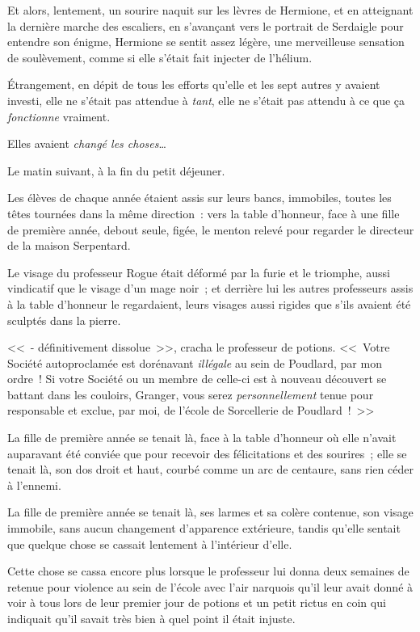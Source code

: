 Et alors, lentement, un sourire naquit sur les lèvres de Hermione, et en atteignant la dernière marche des escaliers, en s'avançant vers le portrait de Serdaigle pour entendre son énigme, Hermione se sentit assez légère, une merveilleuse sensation de soulèvement, comme si elle s'était fait injecter de l'hélium.

Étrangement, en dépit de tous les efforts qu'elle et les sept autres y avaient investi, elle ne s'était pas attendue à \emph{tant}, elle ne s'était pas attendu à ce que ça \emph{fonctionne} vraiment.

Elles avaient \emph{changé les choses}…

\later

Le matin suivant, à la fin du petit déjeuner.

Les élèves de chaque année étaient assis sur leurs bancs, immobiles, toutes les têtes tournées dans la même direction~: vers la table d'honneur, face à une fille de première année, debout seule, figée, le menton relevé pour regarder le directeur de la maison Serpentard.

Le visage du professeur Rogue était déformé par la furie et le triomphe, aussi vindicatif que le visage d'un mage noir~; et derrière lui les autres professeurs assis à la table d'honneur le regardaient, leurs visages aussi rigides que s'ils avaient été sculptés dans la pierre.

<<~- définitivement dissolue~>>, cracha le professeur de potions. <<~Votre Société autoproclamée est dorénavant \emph{illégale} au sein de Poudlard, par mon ordre~! Si votre Société ou un membre de celle-ci est à nouveau découvert se battant dans les couloirs, Granger, vous serez \emph{personnellement} tenue pour responsable et exclue, par moi, de l'école de Sorcellerie de Poudlard~!~>>

La fille de première année se tenait là, face à la table d'honneur où elle n'avait auparavant été conviée que pour recevoir des félicitations et des sourires~; elle se tenait là, son dos droit et haut, courbé comme un arc de centaure, sans rien céder à l'ennemi.

La fille de première année se tenait là, ses larmes et sa colère contenue, son visage immobile, sans aucun changement d'apparence extérieure, tandis qu'elle sentait que quelque chose se cassait lentement à l'intérieur d'elle.

Cette chose se cassa encore plus lorsque le professeur lui donna deux semaines de retenue pour violence au sein de l'école avec l'air narquois qu'il leur avait donné à voir à tous lors de leur premier jour de potions et un petit rictus en coin qui indiquait qu'il savait très bien à quel point il était injuste.

